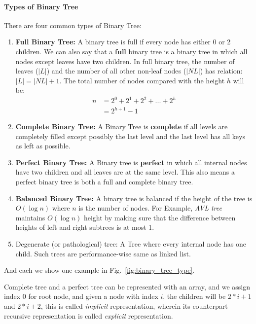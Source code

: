 \documentclass[../main.tex]{subfiles}
\begin{document}
\paragraph{Types of Binary Tree}
There are four common types of Binary Tree:
\begin{enumerate}
    \item \textbf{Full Binary Tree:} A binary tree is full if every node has either 0 or 2 children. We can also say that a \textbf{full} binary tree is a binary tree in which all nodes except leaves have two children.  In full binary tree, the number of leaves ($|L|$)  and the number of all other non-leaf nodes ($|NL|$) has relation: $|L| = |NL| + 1$. The total number of nodes compared with the height $h$ will be:
    \begin{align}
        n &=2^0+2^1+2^2+...+2^h\\
        &= 2^{h+1}-1
    \end{align}
    \item \textbf{Complete Binary Tree:} A Binary Tree is \textbf{complete} if all levels are completely filled except possibly the last level and the last level has all keys as left as possible.
    
    \item \textbf{Perfect Binary Tree:} A Binary tree is \textbf{perfect} in which all internal nodes have two children and all leaves are at the same level. This also means a perfect binary tree is both a full and complete binary tree.
    
    \item \textbf{Balanced Binary Tree:} A binary tree is balanced if the height of the tree is $O(\log n)$ where $n$ is the number of nodes. For Example, \textit{AVL tree} maintains $O(\log n)$ height by making sure that the difference between heights of left and right subtrees is at most 1.
    
    \item Degenerate (or pathological) tree:  A Tree where every internal node has one child. Such trees are performance-wise same as linked list.
\end{enumerate}
And each we show one example in Fig.~\ref{fig:binary_tree_type}.

Complete tree and a perfect tree can be represented with an array, and we assign index 0 for root node, and given a node with index $i$, the children will be $2*i+1$ and $2*i+2$, this is called \textit{implicit} representation, wherein its counterpart recursive representation is called \textit{explicit} representation. 






\end{document}
